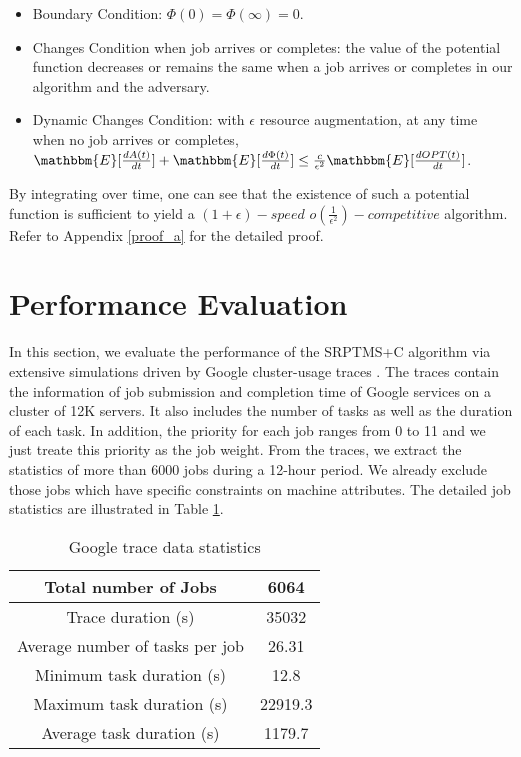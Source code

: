 \documentclass[10pt,conference,compsocconf,letterpaper]{IEEEtran}
\begin{document}
\begin{itemize}
\item Boundary Condition: $\Phi(0) = \Phi(\infty) = 0$.
\item Changes Condition when job arrives or completes: the value of the potential function decreases or remains the same  when a job arrives or completes
in our algorithm and the adversary.
\item Dynamic Changes Condition: with $\epsilon$ resource augmentation,
at any time when no job arrives or completes, $\mathbbm{E}[\frac{dA(t)}{dt}] + \mathbbm{E}[\frac{d\Phi(t)}{dt}] \leq \frac{c}{\epsilon^2}\mathbbm{E} [\frac{dOPT(t)}{dt}]$.
\end{itemize}

By integrating over time, one can see that the existence of such a potential function is sufficient to yield a $(1+\epsilon)-speed$ $o(\frac{1}{\epsilon^2})-competitive$
algorithm. Refer to Appendix \ref{proof_a} for the detailed proof. 





\section{Performance Evaluation}
\label{evaluation}
In this section, we evaluate the performance of the SRPTMS+C algorithm via
extensive simulations driven by Google cluster-usage traces
\cite{Google_trace}. The traces contain the information of job submission and completion time of
Google services on a cluster
of 12K servers. It also includes the number of tasks as well as the duration of each task. In addition, the priority for each job
ranges from 0 to 11 and we just treate this priority as the job weight.
From the traces, we extract the statistics of more than 6000 jobs during a 12-hour period.
 We already exclude those jobs which have specific constraints on machine attributes.
The detailed job statistics are illustrated in Table \ref{table-trace-1}.


\begin{table}
\normalsize
\centering
\caption{Google trace data statistics}
\label{table-trace-1}
\begin{tabular}{|c|c|}
  \hline
Total number of Jobs &  6064\\
  \hline
  Trace duration (s) & 35032\\
  \hline
  Average number of tasks per job & 26.31 \\
  \hline
  Minimum task duration (s) & 12.8 \\
  \hline
  Maximum task duration (s) & 22919.3 \\
  \hline
  Average task duration (s) & 1179.7 \\
  \hline
\end{tabular}
\vspace{-1em}
\end{table}
\end{document}
